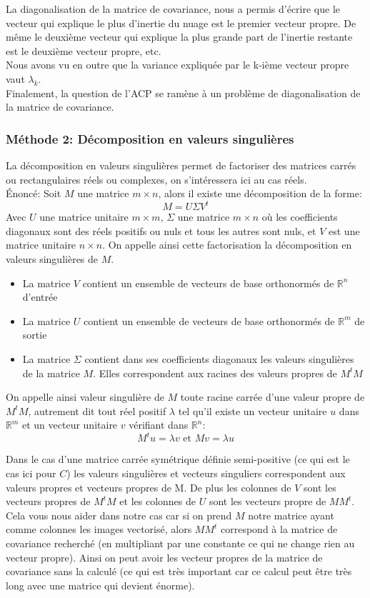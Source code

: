 \documentclass[12pt,french]{article}
\theoremstyle{plain}
\theoremstyle{definition}
\begin{document}
La diagonalisation de la matrice de covariance, nous a permis d'écrire que le vecteur qui explique le plus d'inertie du nuage est le premier vecteur propre.
De même le deuxième vecteur qui explique la plus grande part de l'inertie restante est le deuxième vecteur propre, etc.\\
Nous avons vu en outre que la variance expliquée par le k-ième vecteur propre vaut $\lambda_k$.\\
Finalement, la question de l'ACP se ramène à un problème de diagonalisation de la matrice de covariance.

\subsubsection{Méthode 2: Décomposition en valeurs singulières}

La décomposition en valeurs singulières permet de factoriser des matrices carrés ou rectangulaires réels ou complexes, on s'intéressera ici au cas réels. \\
Énoncé: Soit $M$ une matrice $m \times n$, alors il existe une décomposition de la forme: \\
$$M=U\Sigma V^t$$
Avec $U$ une matrice unitaire $m \times m$, $\Sigma$ une matrice $m\times n$ où les coefficients diagonaux sont des réels positifs ou nuls et tous les autres sont nuls, et $V$ est une matrice unitaire $n \times n$. On appelle ainsi cette factorisation la décomposition en valeurs singulières de $M$.
\begin{itemize}
\item La matrice $V$ contient un ensemble de vecteurs de base orthonormés de $\mathbb{R}^n$ d'entrée
\item La matrice $U$ contient un ensemble de vecteurs de base orthonormés de $\mathbb{R}^m$ de sortie
\item La matrice $\Sigma$ contient dans ses coefficients diagonaux les valeurs singulières de la matrice $M$. Elles correspondent aux racines des valeurs propres de $M^t M$
\end{itemize}

On appelle ainsi valeur singulière de $M$ toute racine carrée d'une valeur propre de $M^t M$, autrement dit tout réel positif $\lambda$ tel qu'il existe un vecteur unitaire $u$ dans $\mathbb{R}^m$ et un vecteur unitaire $v$ vérifiant dans $\mathbb{R}^n$:
$$ M^t u = \lambda v \text{ et } Mv = \lambda u$$

Dans le cas d'une matrice carrée symétrique définie semi-positive (ce qui est le cas ici pour $C$) les valeurs singulières et vecteurs singuliers correspondent aux valeurs propres et vecteurs propres de M.
De plus les colonnes de $V$ sont les vecteurs propres de $M^tM$ et les colonnes de $U$ sont les vecteurs propre de $MM^t$. Cela vous nous aider dans notre cas car si on prend $M$ notre matrice ayant comme colonnes les images vectorisé, alors $MM^t$ correspond à la matrice de covariance recherché (en multipliant par une constante ce qui ne change rien au vecteur propre). Ainsi on peut avoir les vecteur propres de la matrice de covariance sans la calculé (ce qui est très important car ce calcul peut être très long avec une matrice qui devient énorme). 
\end{document}
